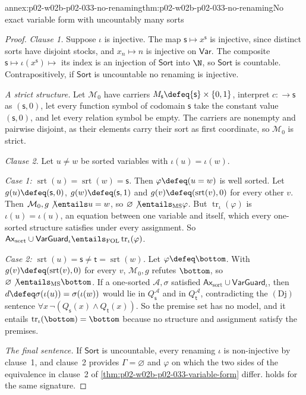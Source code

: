 \begin{annexitem}{annex:p02-w02b-p02-033-no-renaming}{thm:p02-w02b-p02-033-no-renaming}{No exact variable form with uncountably many sorts}
\begin{proof}
\emph{Clause 1.}  Suppose \(\iota\) is injective.  The map
\(\mathsf s\mapsto x^{\mathsf s}\) is injective, since distinct sorts have
disjoint stocks, and \(x_n\mapsto n\) is injective on \(\mathsf{Var}\).  The
composite \(\mathsf s\mapsto\iota(x^{\mathsf s})\mapsto\) its index is an
injection of \(\mathsf{Sort}\) into \(\N\), so \(\mathsf{Sort}\) is
countable.  Contrapositively, if \(\mathsf{Sort}\) is uncountable no
renaming is injective.

\emph{A strict structure.}  Let \(\mathcal M_0\) have carriers
\(M_{\mathsf s}\defeq\{\mathsf s\}\times\{0,1\}\), interpret
\(c:\longrightarrow\mathsf s\) as \((\mathsf s,0)\), let every function
symbol of codomain \(\mathsf s\) take the constant value \((\mathsf s,0)\),
and let every relation symbol be empty.  The carriers are nonempty and
pairwise disjoint, as their elements carry their sort as first coordinate, so
\(\mathcal M_0\) is strict.

\emph{Clause 2.}  Let \(u\ne w\) be sorted variables with
\(\iota(u)=\iota(w)\).

\emph{Case 1: \(\operatorname{srt}(u)=\operatorname{srt}(w)=\mathsf s\).}
Then \(\varphi\defeq(u=w)\) is well sorted.  Let \(g(u)\defeq(\mathsf s,0)\),
\(g(w)\defeq(\mathsf s,1)\) and \(g(v)\defeq(\operatorname{srt}(v),0)\) for
every other \(v\).  Then \(\mathcal M_0,g\not\entails u=w\), so
\(\varnothing\not\entails_{\mathrm{MS}}\varphi\).  But
\(\operatorname{tr}_{\iota}(\varphi)\) is \(\iota(u)=\iota(u)\), an equation
between one variable and itself, which every one-sorted structure satisfies
under every assignment.  So
\(\mathsf{Ax}_{\mathrm{sort}}\cup\mathsf{VarGuard}_{\iota}\entails_{\mathrm{FOL}}
\operatorname{tr}_{\iota}(\varphi)\).

\emph{Case 2: \(\operatorname{srt}(u)=\mathsf s\ne\mathsf t=
\operatorname{srt}(w)\).}  Let \(\varphi\defeq\bottom\).  With
\(g(v)\defeq(\operatorname{srt}(v),0)\) for every \(v\), \(\mathcal M_0,g\)
refutes \(\bottom\), so \(\varnothing\not\entails_{\mathrm{MS}}\bottom\).  If a
one-sorted \(\mathcal A,\sigma\) satisfied
\(\mathsf{Ax}_{\mathrm{sort}}\cup\mathsf{VarGuard}_{\iota}\), then
\(d\defeq\sigma(\iota(u))=\sigma(\iota(w))\) would lie in
\(Q_{\mathsf s}^{\mathcal A}\) and in \(Q_{\mathsf t}^{\mathcal A}\),
contradicting the \((\mathrm{Dj})\) sentence
\(\forall x\,\neg(Q_{\mathsf s}(x)\land Q_{\mathsf t}(x))\).  So the premise
set has no model, and it entails \(\operatorname{tr}_{\iota}(\bottom)=\bottom\)
because no structure and assignment satisfy the premises.

\emph{The final sentence.}  If \(\mathsf{Sort}\) is uncountable, every
renaming \(\iota\) is non-injective by clause~1, and clause~2 provides
\(\Gamma=\varnothing\) and \(\varphi\) on which the two sides of the
equivalence in clause~2 of \cref{thm:p02-w02b-p02-033-variable-form} differ.
 holds for the same signature.
\end{proof}
\end{annexitem}
